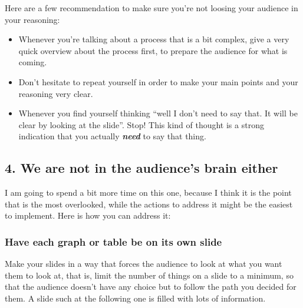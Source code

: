 \documentclass[
]{book}
\providecommand{\tightlist}{%
  \setlength{\itemsep}{0pt}\setlength{\parskip}{0pt}}
\begin{document}
Here are a few recommendation to make sure you're not loosing your audience in your reasoning:

\begin{itemize}
\tightlist
\item
  Whenever you're talking about a process that is a bit complex, give a very quick overview about the process first, to prepare the audience for what is coming.\\
\item
  Don't hesitate to repeat yourself in order to make your main points and your reasoning very clear.\\
\item
  Whenever you find yourself thinking ``well I don't need to say that. It will be clear by looking at the slide''. Stop! This kind of thought is a strong indication that you actually \textbf{\emph{need}} to say that thing.
\end{itemize}

\hypertarget{we-are-not-in-the-audiences-brain-either}{%
\subsection{4. We are not in the audience's brain either}\label{we-are-not-in-the-audiences-brain-either}}

I am going to spend a bit more time on this one, because I think it is the point that is the most overlooked, while the actions to address it might be the easiest to implement. Here is how you can address it:

\hypertarget{have-each-graph-or-table-be-on-its-own-slide}{%
\subsubsection{Have each graph or table be on its own slide}\label{have-each-graph-or-table-be-on-its-own-slide}}

Make your slides in a way that forces the audience to look at what you want them to look at, that is, limit the number of things on a slide to a minimum, so that the audience doesn't have any choice but to follow the path you decided for them. A slide such at the following one is filled with lots of information.
\end{document}
